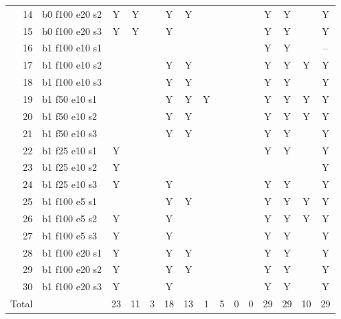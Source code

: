 \documentclass[10pt,a4paper]{article}
\newcommand{\Y}{\cellcolor{red!15}}
\begin{document}
\begin{table}[h]
\begin{tabular}{rl|ccc|ccc|ccc|ccc|c}
14 & b0 f100 e20 s2 & \Y Y & \Y Y &  & \Y Y & \Y Y &  &  &  &  & \Y Y & \Y Y &  & Y\\
15 & b0 f100 e20 s3 & \Y Y & \Y Y &  & \Y Y &  &  &  &  &  & \Y Y & \Y Y &  & Y\\
\midrule
16 & b1 f100 e10 s1 &  &  &  &  &  &  &  &  &  & \Y Y & \Y Y &  & --\\
17 & b1 f100 e10 s2 &  &  &  & \Y Y & \Y Y &  &  &  &  & \Y Y & \Y Y & \Y Y & Y\\
18 & b1 f100 e10 s3 &  &  &  & \Y Y & \Y Y &  &  &  &  & \Y Y & \Y Y &  & Y\\
19 & b1 f50 e10 s1 &  &  &  & \Y Y & \Y Y & \Y Y &  &  &  & \Y Y & \Y Y & \Y Y & Y\\
20 & b1 f50 e10 s2 &  &  &  & \Y Y & \Y Y &  &  &  &  & \Y Y & \Y Y & \Y Y & Y\\
21 & b1 f50 e10 s3 &  &  &  & \Y Y & \Y Y &  &  &  &  & \Y Y & \Y Y &  & Y\\
22 & b1 f25 e10 s1 & \Y Y &  &  &  &  &  &  &  &  & \Y Y & \Y Y &  & Y\\
23 & b1 f25 e10 s2 & \Y Y &  &  &  &  &  &  &  &  &  &  &  & Y\\
24 & b1 f25 e10 s3 & \Y Y &  &  & \Y Y &  &  &  &  &  & \Y Y & \Y Y &  & Y\\
25 & b1 f100 e5 s1 &  &  &  & \Y Y & \Y Y &  &  &  &  & \Y Y & \Y Y & \Y Y & Y\\
26 & b1 f100 e5 s2 & \Y Y &  &  & \Y Y &  &  &  &  &  & \Y Y & \Y Y & \Y Y & Y\\
27 & b1 f100 e5 s3 & \Y Y &  &  & \Y Y &  &  &  &  &  & \Y Y & \Y Y &  & Y\\
28 & b1 f100 e20 s1 & \Y Y &  &  & \Y Y & \Y Y &  &  &  &  & \Y Y & \Y Y &  & Y\\
29 & b1 f100 e20 s2 & \Y Y &  &  & \Y Y & \Y Y &  &  &  &  & \Y Y & \Y Y &  & Y\\
30 & b1 f100 e20 s3 & \Y Y &  &  & \Y Y &  &  &  &  &  & \Y Y & \Y Y &  & Y\\
\midrule Total & & 23 & 11 & 3 & 18 & 13 & 1 & 5 & 0 & 0 & 29 & 29 & 10 & 29\\\bottomrule\end{tabular}\end{table}
\FloatBarrier
\end{document}
